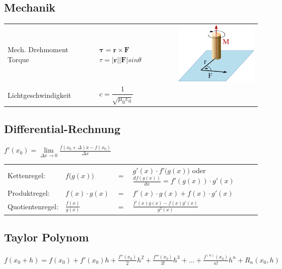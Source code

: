 \subsection{Mechanik}

\begin{tabularx}{\columnwidth}{p{3cm}XX}
	Mech. Drehmoment \newline Torque& $\bm\tau = \bm r\times \bm F$\newline $\tau = |\bm r| |\bm F| sin\theta$ 
	& \vspace*{-1cm}\includegraphics[width = 4cm ]{images/drehmoment}\\
	Lichtgeschwindigkeit & $c = \dfrac{1}{\sqrt{\mu_0\varepsilon_0}}$
\end{tabularx}

\subsection{Differential-Rechnung}
$f'(x_0)=\lim\limits_{\Delta x\rightarrow 0}
\frac{f(x_0+\Delta)x-f(x_0)}{\Delta x}$\\
\begin{tabular}{llll}
	Kettenregel:	& $f\big(g(x)\big)$ &$=$ & $g'(x)\cdot f'\big(g(x)\big)$
	oder $\frac{d f(g(x))}{dx} = f'(g(x)) \cdot g'(x)$\\[0.1cm] Produktregel:	&
	$f(x)\cdot g(x)$ &$=$ & $f'(x)\cdot g(x) + f(x)\cdot g'(x)$\\[0.1cm] Quotientenregel:& $\frac{f(x)}{g(x)}$ &$=$ & $\frac{f'(x)g(x)-f(x)g'(x)}{g^2(x)}$\\
\end{tabular}


\subsection{Taylor Polynom}
$f(x_0+h)=f(x_0) + f'(x_0)h + \frac{f''(x_0)}{2}h^2 + \frac{f'''(x_0)}{3!}h^3 + \ldots + \frac{f^{(n)}(x_0)}{n!}h^n + R_n(x_0, h)$


